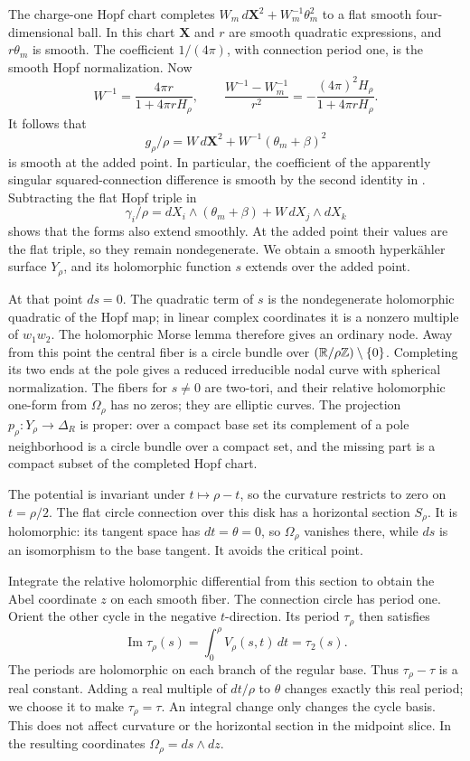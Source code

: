 The charge-one Hopf chart completes
\(W_m\,d\mathbf X^2+W_m^{-1}\theta_m^2\) to a flat smooth
four-dimensional ball.  In this chart \(\mathbf X\) and \(r\) are
smooth quadratic expressions, and \(r\theta_m\) is smooth.
The coefficient \(1/(4\pi)\), with connection period one, is the
smooth Hopf normalization.  Now
\begin{equation}\label{eq:nodal-pole-inverse}
 W^{-1}=\frac{4\pi r}{1+4\pi rH_\rho},\qquad
 \frac{W^{-1}-W_m^{-1}}{r^2}
    =-\frac{(4\pi)^2H_\rho}{1+4\pi rH_\rho}.
\end{equation}
It follows that
\[
 g_\rho/\rho=W\,d\mathbf X^2+
                   W^{-1}(\theta_m+\beta)^2
\]
is smooth at the added point.  In particular, the coefficient of
the apparently singular squared-connection difference is smooth
by the second identity in .
Subtracting the flat Hopf triple in
\[
 \gamma_i/\rho=dX_i\wedge(\theta_m+\beta)+W\,dX_j\wedge dX_k
\]
shows that the forms also extend smoothly.  At the added point
their values are the flat triple, so they remain nondegenerate.
We obtain a smooth hyperk\"ahler surface \(Y_\rho\), and its
holomorphic function \(s\) extends over the added point.

At that point \(ds=0\).  The quadratic term of \(s\) is the
nondegenerate holomorphic quadratic of the Hopf map; in linear
complex coordinates it is a nonzero multiple of \(w_1w_2\).
The holomorphic Morse lemma therefore gives an ordinary node.
Away from this point the central fiber is a circle bundle over
\((\mathbb R/\rho\mathbb Z)\setminus\{0\}\).  Completing its two ends at the pole
gives a reduced irreducible nodal curve with spherical normalization.
The fibers for \(s\ne0\) are two-tori, and their relative holomorphic
one-form from \(\Omega_\rho\) has no zeros; they are elliptic curves.
The projection \(p_\rho:Y_\rho\to\Delta_R\) is proper: over a compact
base set its complement of a pole neighborhood is a circle bundle
over a compact set, and the missing part is a compact subset of
the completed Hopf chart.

The potential is invariant under \(t\mapsto\rho-t\), so the
curvature restricts to zero on \(t=\rho/2\).
The flat circle connection over this disk has a horizontal section
\(S_\rho\).  It is holomorphic: its tangent space has
\(dt=\theta=0\), so \(\Omega_\rho\) vanishes there, while \(ds\)
is an isomorphism to the base tangent.  It avoids the critical point.

Integrate the relative holomorphic differential from this section
to obtain the Abel coordinate \(z\) on each smooth fiber.
The connection circle has period one.  Orient the other cycle in
the negative \(t\)-direction.  Its period \(\tau_\rho\) then satisfies
\[
 \operatorname{Im}\tau_\rho(s)
       =\int_0^\rho V_\rho(s,t)\,dt=\tau_2(s).
\]
The periods are holomorphic on each branch of the regular base.
Thus \(\tau_\rho-\tau\) is a real constant.
Adding a real multiple of \(dt/\rho\) to \(\theta\) changes exactly
this real period; we choose it to make \(\tau_\rho=\tau\).
An integral change only changes the cycle basis.
This does not affect curvature or the horizontal section in the
midpoint slice.  In the resulting coordinates
\(\Omega_\rho=ds\wedge dz\).

